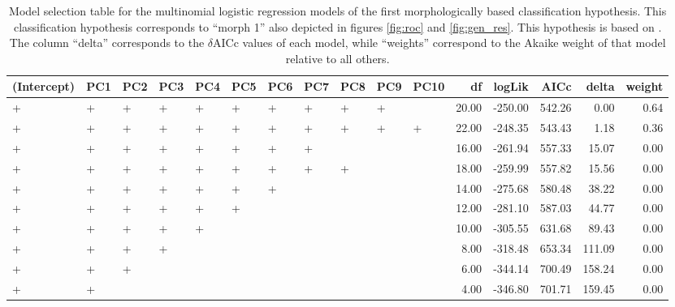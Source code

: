 \documentclass[12pt,letterpaper]{article}\usepackage{graphicx, color}
\begin{document}
\begin{table}
  \centering
{\small
\begin{tabular}{lllllllllllrrrrr}
  \hline
(Intercept) & PC1 & PC2 & PC3 & PC4 & PC5 & PC6 & PC7 & PC8 & PC9 & PC10 & df & logLik & AICc & delta & weight \\ 
  \hline
+ & + & + & + & + & + & + & + & + & + &  & 20.00 & -250.00 & 542.26 & 0.00 & 0.64 \\ 
  + & + & + & + & + & + & + & + & + & + & + & 22.00 & -248.35 & 543.43 & 1.18 & 0.36 \\ 
  + & + & + & + & + & + & + & + &  &  &  & 16.00 & -261.94 & 557.33 & 15.07 & 0.00 \\ 
  + & + & + & + & + & + & + & + & + &  &  & 18.00 & -259.99 & 557.82 & 15.56 & 0.00 \\ 
  + & + & + & + & + & + & + &  &  &  &  & 14.00 & -275.68 & 580.48 & 38.22 & 0.00 \\ 
  + & + & + & + & + & + &  &  &  &  &  & 12.00 & -281.10 & 587.03 & 44.77 & 0.00 \\ 
  + & + & + & + & + &  &  &  &  &  &  & 10.00 & -305.55 & 631.68 & 89.43 & 0.00 \\ 
  + & + & + & + &  &  &  &  &  &  &  & 8.00 & -318.48 & 653.34 & 111.09 & 0.00 \\ 
  + & + & + &  &  &  &  &  &  &  &  & 6.00 & -344.14 & 700.49 & 158.24 & 0.00 \\ 
  + & + &  &  &  &  &  &  &  &  &  & 4.00 & -346.80 & 701.71 & 159.45 & 0.00 \\ 
   \hline
\end{tabular}
}


  \caption{Model selection table for the multinomial logistic regression models of the first morphologically based classification hypothesis. This classification hypothesis corresponds to ``morph 1'' also depicted in figures \ref{fig:roc} and \ref{fig:gen_res}. This hypothesis is based on \citet{Seeliger1945}. The column ``delta'' corresponds to the \(\delta\)AICc values of each model, while ``weights'' correspond to the Akaike weight of that model relative to all others.}
  \label{tab:mod_sel_1}
\end{table}
\end{document}
